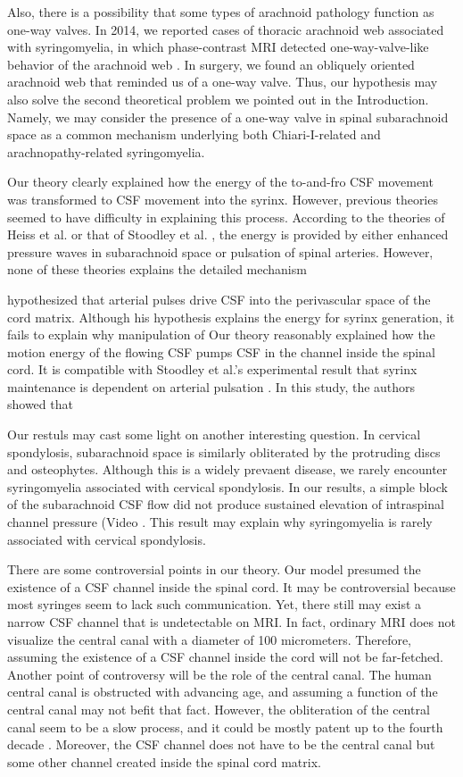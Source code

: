 \documentclass[fleqn,10pt]{wlscirep}
\begin{document}
Also, there is a possibility that some types of arachnoid pathology
function as one-way valves. In 2014, we reported cases of thoracic
arachnoid web associated with syringomyelia, in which phase-contrast MRI
detected one-way-valve-like behavior of the arachnoid web
\cite{chang2014dorsal}. In surgery, we found an obliquely oriented
arachnoid web that reminded us of a one-way valve. Thus, our hypothesis may
also solve the second theoretical problem we pointed out in the
Introduction. Namely, we may consider the presence of a one-way valve in
spinal subarachnoid space as a common mechanism underlying both
Chiari-I-related and arachnopathy-related syringomyelia.

Our theory clearly explained how the energy of the to-and-fro CSF movement
was transformed to CSF movement into the syrinx. However, previous
theories seemed to have difficulty in explaining this process. According to
the theories of Heiss et al. \cite{heiss1999elucidating} or that of
Stoodley et al. \cite{stoodley2000mechanisms}, the energy is provided by
either enhanced pressure waves in subarachnoid space or pulsation of spinal
arteries. However, none of these theories explains the detailed mechanism

hypothesized that arterial pulses drive CSF
into the perivascular space of the cord matrix. Although his hypothesis
explains the energy for syrinx generation, it fails to explain why
manipulation of Our theory reasonably
explained how the motion energy of the flowing CSF pumps CSF in the channel
inside the spinal cord. It is compatible with Stoodley et al.'s
experimental result that syrinx maintenance is dependent on arterial
pulsation . In this study, the authors showed that

Our restuls may cast some light on another interesting question. In
cervical spondylosis, subarachnoid space is similarly obliterated by the
protruding discs and osteophytes. Although this is a widely prevaent
disease, we rarely encounter syringomyelia associated with cervical
spondylosis. In our results, a simple block of the subarachnoid CSF flow
did not produce sustained elevation of intraspinal channel pressure (Video
\cite{video:simple_block}.  This result may explain why syringomyelia is
rarely associated with cervical spondylosis.

There are some controversial points in our theory. Our model presumed the
existence of a CSF channel inside the spinal cord. It may be controversial
because most syringes seem to lack such communication. Yet, there still may
exist a narrow CSF channel that is undetectable on MRI. In fact, ordinary
MRI does not visualize the central canal with a diameter of 100
micrometers. Therefore, assuming the existence of a CSF channel inside the
cord will not be far-fetched. Another point of controversy will be the role
of the central canal. The human central canal is obstructed with advancing
age, and assuming a function of the central canal may not befit that fact.
However, the obliteration of the central canal seem to be a slow process,
and it could be mostly patent up to the fourth decade
\cite{newman1981observations, yasui1999agerelated}. Moreover, the CSF
channel does not have to be the central canal but some other channel
created inside the spinal cord matrix.


\end{document}

